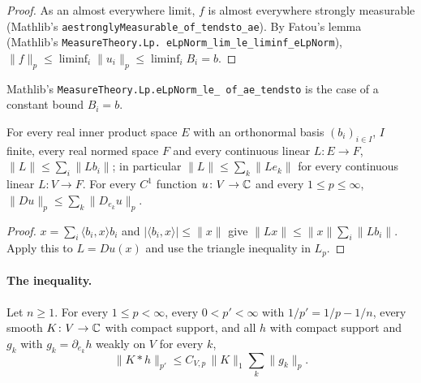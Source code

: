 \begin{proof}
\leanok
As an almost everywhere limit, $f$ is almost everywhere strongly measurable (Mathlib's
\texttt{aestronglyMeasurable\_\allowbreak of\_\allowbreak tendsto\_\allowbreak ae}). By Fatou's
lemma (Mathlib's \texttt{MeasureTheory.\allowbreak Lp.\allowbreak
eLpNorm\_\allowbreak lim\_\allowbreak le\_\allowbreak liminf\_\allowbreak eLpNorm}),
$\|f\|_p \leq \liminf_i \|u_i\|_p \leq \liminf_i B_i = b$.
\end{proof}

Mathlib's \texttt{MeasureTheory.\allowbreak Lp.\allowbreak eLpNorm\_\allowbreak le\_\allowbreak
of\_\allowbreak ae\_\allowbreak tendsto} is the case of a constant bound $B_i = b$.

\begin{lemma}
\label{lem:derivative-basis-bound}
\leanok
{}
For every real inner product space $E$ with an orthonormal basis $(b_i)_{i \in I}$, $I$ finite,
every real normed space $F$ and every continuous linear $L \colon E \to F$,
$\|L\| \leq \sum_i \|L b_i\|$; in particular $\|L\| \leq \sum_k \|L e_k\|$ for every continuous
linear $L \colon V \to F$. For every $C^1$ function $u \colon V \to \mathbb{C}$ and every
$1 \leq p \leq \infty$, $\|Du\|_p \leq \sum_k \|D_{e_k} u\|_p$.
\end{lemma}

\begin{proof}
\leanok
$x = \sum_i \langle b_i, x \rangle b_i$ and $|\langle b_i, x \rangle| \leq \|x\|$ give
$\|L x\| \leq \|x\| \sum_i \|L b_i\|$. Apply this to $L = Du(x)$ and use the triangle
inequality in $L_p$.
\end{proof}

\paragraph{The inequality.}

\begin{lemma}
\label{lem:gns-mollification}
\leanok
{}
Let $n \geq 1$. For every $1 \leq p < \infty$, every $0 < p' < \infty$ with
$1/p' = 1/p - 1/n$, every smooth $K \colon V \to \mathbb{C}$ with compact support, and all $h$ with
compact support and $g_k$ with $g_k = \partial_{e_k} h$ weakly on $V$ for every $k$,
\[
  \|K * h\|_{p'} \leq C_{V,p} \, \|K\|_1 \sum_k \|g_k\|_p .
\]
\end{lemma}

